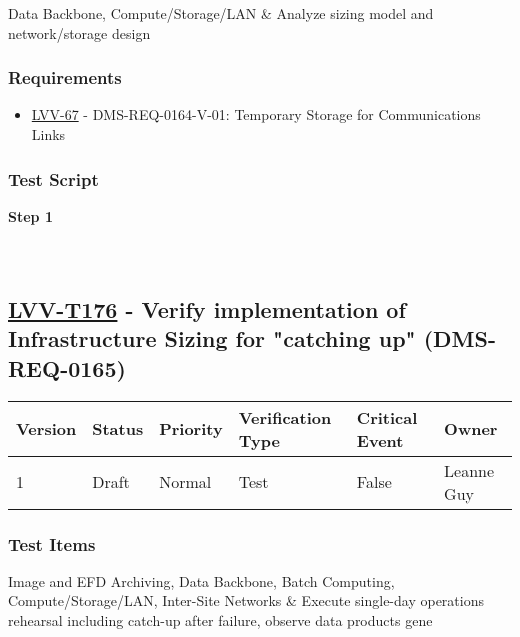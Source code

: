 Data Backbone, Compute/Storage/LAN \& Analyze sizing model and
network/storage design

\hypertarget{requirements-152}{%
\subsubsection{Requirements}\label{requirements-152}}

\begin{itemize}
\tightlist
\item
  \href{https://jira.lsstcorp.org/browse/LVV-67}{LVV-67} -
  DMS-REQ-0164-V-01: Temporary Storage for Communications Links
\end{itemize}

\hypertarget{test-script-152}{%
\subsubsection{Test Script}\label{test-script-152}}

\textbf{Step 1}\\
~\\
~\\

\hypertarget{lvv-t176---verify-implementation-of-infrastructure-sizing-for-catching-up-dms-req-0165}{%
\subsection{\texorpdfstring{\href{https://jira.lsstcorp.org/secure/Tests.jspa\#/testCase/LVV-T176}{LVV-T176}
- Verify implementation of Infrastructure Sizing for "catching up"
(DMS-REQ-0165)}{LVV-T176 - Verify implementation of Infrastructure Sizing for "catching up" (DMS-REQ-0165)}}\label{lvv-t176---verify-implementation-of-infrastructure-sizing-for-catching-up-dms-req-0165}}

\begin{longtable}[]{@{}llllll@{}}
\toprule
Version & Status & Priority & Verification Type & Critical Event &
Owner\tabularnewline
\midrule
\endhead
1 & Draft & Normal & Test & False & Leanne Guy\tabularnewline
\bottomrule
\end{longtable}

\hypertarget{test-items-152}{%
\subsubsection{Test Items}\label{test-items-152}}

Image and EFD Archiving, Data Backbone, Batch Computing,
Compute/Storage/LAN, Inter-Site Networks \& Execute single-day
operations rehearsal including catch-up after failure, observe data
products gene

